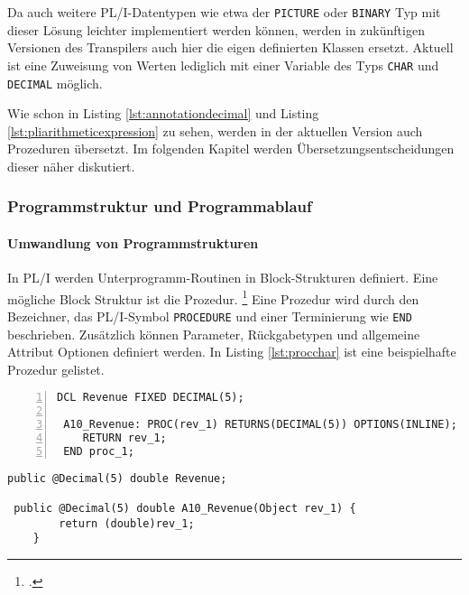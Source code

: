Da auch weitere PL/I-Datentypen wie etwa der \verb+PICTURE+ oder \verb+BINARY+ Typ mit dieser Lösung leichter implementiert werden können, werden in zukünftigen Versionen des Transpilers auch hier die eigen definierten Klassen ersetzt.
Aktuell ist eine Zuweisung von Werten lediglich mit einer Variable des Typs \verb+CHAR+ und \verb+DECIMAL+ möglich.

Wie schon in Listing \ref{lst:annotationdecimal} und Listing \ref{lst:pliarithmeticexpression} zu sehen, werden in der aktuellen Version auch Prozeduren übersetzt.
Im folgenden Kapitel werden Übersetzungsentscheidungen dieser näher diskutiert.

\pagebreak
\subsubsection{Programmstruktur und Programmablauf}
\paragraph{Umwandlung von Programmstrukturen }\label{programstruct}

In PL/I werden Unterprogramm-Routinen in Block-Strukturen definiert. Eine mögliche Block Struktur ist die Prozedur. \footcite[Vgl. ][S. 97ff. ]{pliref}
Eine Prozedur wird durch den Bezeichner, das PL/I-Symbol \verb+PROCEDURE+ und einer Terminierung wie \verb+END+ beschrieben.
Zusätzlich können Parameter, Rückgabetypen und allgemeine Attribut Optionen definiert werden. In Listing \ref{lst:procchar} ist eine beispielhafte Prozedur gelistet.

\begin{minipage}[b]{0.48\linewidth}
	\centering
	\lstset{language=PL/I,label=SliceExaple}
	\begin{lstlisting}[frame=single, numbers=left, mathescape,%
		caption={Prozeduren}, label={lst:procchar},
		basicstyle=\fontsize{9}{13}\selectfont\ttfamily]
 DCL Revenue FIXED DECIMAL(5);

 A10_Revenue: PROC(rev_1) RETURNS(DECIMAL(5)) OPTIONS(INLINE);
 	RETURN rev_1;
 END proc_1;
	\end{lstlisting}
\end{minipage}
\hspace{0.5cm}
\begin{minipage}[b]{0.48\linewidth}
	\centering
	\lstset{language=Java,label=SliceExaple}
	\begin{lstlisting}[frame=single, mathescape,%
		title={" "},
		basicstyle=\fontsize{9}{13}\selectfont\ttfamily]
 public @Decimal(5) double Revenue;		
 
 public @Decimal(5) double A10_Revenue(Object rev_1) { 
		return (double)rev_1;
	}
	\end{lstlisting}
\end{minipage}

